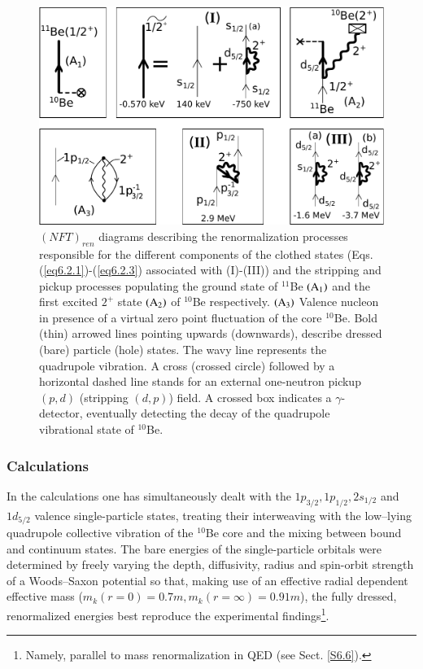   \begin{figure}
  	\centerline{\includegraphics*[width=12cm,angle=0]{C8/figsC8/Fig6_2_3x}}
  	\caption{ $(NFT)_{ren}$ diagrams describing the renormalization  processes
  		responsible for the different components of the clothed states (Eqs. (\ref{eq6.2.1})-(\ref{eq6.2.3}) associated with 
  		(I)-(III)) and the stripping and pickup processes populating the ground state of $^{11}$Be ${\rm  (A_1)} $ and the first excited $2^+$
  		state ${\rm (A_2)} $ of $^{10}$Be respectively. ${\rm (A_3)} $ Valence nucleon in presence 
  		of a virtual zero point fluctuation of the core $^{10}$Be. Bold (thin) arrowed lines pointing upwards
  		(downwards), describe dressed (bare) particle (hole) states. The wavy line represents the 
  		quadrupole vibration. A cross (crossed circle) followed by  a horizontal dashed line stands for an external one-neutron 
  		pickup $(p,d)$ (stripping $(d,p)$) field. A crossed box indicates a $\gamma$-detector, eventually detecting the  decay of the quadrupole vibrational state of $^{10}$Be.}\label{fig6.2.3x}
  \end{figure} 

  \subsubsection{Calculations}
  
  
  In the calculations one has simultaneously dealt with the $1p_{3/2}, 1p_{1/2}, 2s_{1/2}$ and $1d_{5/2}$ valence
  single-particle states,
  treating their interweaving with the low--lying quadrupole collective vibration
  of the $^{10}$Be core and  the mixing 
  between bound and continuum states.   
  The bare energies of the single-particle orbitals were determined by freely varying the depth, diffusivity, radius and spin-orbit strength of a Woods--Saxon potential so that, making use of an effective radial dependent effective mass ($m_k(r=0)=0.7m, m_k(r=\infty)=0.91m$), the fully dressed, renormalized energies best reproduce the experimental findings\footnote{Namely, parallel to mass renormalization in QED (see Sect. \ref{S6.6}).}.  
  
